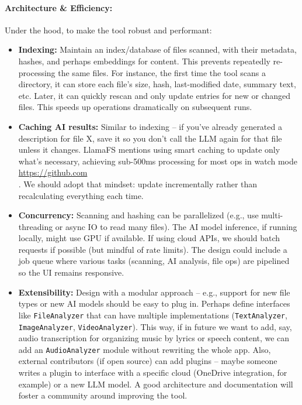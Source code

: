 \documentclass[11pt]{article}
\begin{document}
\paragraph{Architecture \& Efficiency:} Under the hood, to make the tool robust and performant:
\begin{itemize}
  \item \textbf{Indexing:} Maintain an index/database of files scanned, with their metadata, hashes, and perhaps embeddings for content. This prevents repeatedly re-processing the same files. For instance, the first time the tool scans a directory, it can store each file’s size, hash, last-modified date, summary text, etc. Later, it can quickly rescan and only update entries for new or changed files. This speeds up operations dramatically on subsequent runs.
  \item \textbf{Caching AI results:} Similar to indexing -- if you’ve already generated a description for file X, save it so you don’t call the LLM again for that file unless it changes. LlamaFS mentions using smart caching to update only what’s necessary, achieving sub-500ms processing for most ops in watch mode \\ \url{https://github.com} \\ . We should adopt that mindset: update incrementally rather than recalculating everything each time.
  \item \textbf{Concurrency:} Scanning and hashing can be parallelized (e.g., use multi-threading or async IO to read many files). The AI model inference, if running locally, might use GPU if available. If using cloud APIs, we should batch requests if possible (but mindful of rate limits). The design could include a job queue where various tasks (scanning, AI analysis, file ops) are pipelined so the UI remains responsive.
  \item \textbf{Extensibility:} Design with a modular approach -- e.g., support for new file types or new AI models should be easy to plug in. Perhaps define interfaces like \texttt{FileAnalyzer} that can have multiple implementations (\texttt{TextAnalyzer}, \texttt{ImageAnalyzer}, \texttt{VideoAnalyzer}). This way, if in future we want to add, say, audio transcription for organizing music by lyrics or speech content, we can add an \texttt{AudioAnalyzer} module without rewriting the whole app. Also, external contributors (if open source) can add plugins -- maybe someone writes a plugin to interface with a specific cloud (OneDrive integration, for example) or a new LLM model. A good architecture and documentation will foster a community around improving the tool.
\end{itemize}
\end{document}

